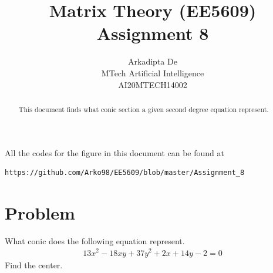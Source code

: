 \documentclass[journal,12pt,twocolumn]{IEEEtran}
\begin{document}
\makeatletter
{}
\makeatother
\let\StandardTheFigure\thefigure
\let\vec\mathbf
\renewcommand{\thefigure}{\theproblem}
\def\putbox#1#2#3{\makebox[0in][l]{\makebox[#1][l]{}\raisebox{\baselineskip}[0in][0in]{\raisebox{#2}[0in][0in]{#3}}}}
     \def\rightbox#1{\makebox[0in][r]{#1}}
     \def\centbox#1{\makebox[0in]{#1}}
     \def\topbox#1{\raisebox{-\baselineskip}[0in][0in]{#1}}
     \def\midbox#1{\raisebox{-0.5\baselineskip}[0in][0in]{#1}}
\vspace{3cm}
\title{Matrix Theory (EE5609) Assignment 8}
\author{Arkadipta De\\MTech Artificial Intelligence\\AI20MTECH14002}

\maketitle
\newpage
\bigskip
\renewcommand{\thefigure}{\theenumi}
\renewcommand{\thetable}{\theenumi}

\begin{abstract}
This document finds what conic section a given second degree equation represent.
\end{abstract}

All the codes for the figure in this document can be found at
\begin{lstlisting}
https://github.com/Arko98/EE5609/blob/master/Assignment_8
\end{lstlisting}

\section{Problem}
What conic does the following equation represent. 
\begin{align*}
13x^2-18xy+37y^2+2x+14y-2 = 0
\end{align*}
Find the center.
\end{document}
